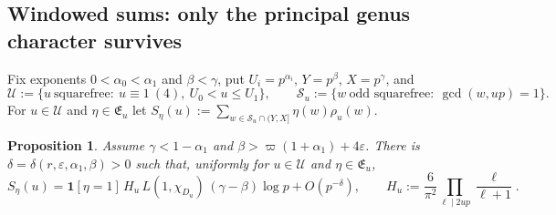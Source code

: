 \documentclass[11pt,reqno]{amsart}
\newtheorem{proposition}[theorem]{Proposition}
\theoremstyle{definition}
\newcommand{\eps}{\varepsilon}
\newcommand{\cE}{\mathfrak E}
\newcommand{\cS}{\mathcal S}
\newcommand{\cU}{\mathcal U}
\begin{document}
\subsection{Windowed sums: only the principal genus character survives}
Fix exponents $0<\alpha_0<\alpha_1$ and $\beta<\gamma$, put
$U_i=p^{\alpha_i}$, $Y=p^\beta$, $X=p^\gamma$, and
\[
 \cU:=\{u\ \text{squarefree}:\ u\equiv1\ (4),\ U_0<u\le U_1\},\qquad
 \cS_u:=\{w\ \text{odd squarefree}:\ \gcd(w,up)=1\}.
\]
For $u\in\cU$ and $\eta\in\cE_u$ let
$S_\eta(u):=\sum_{w\in\cS_u\cap(Y,X]}\eta(w)\rho_u(w)$.

\begin{proposition}\label{prop:window}
Assume $\gamma<1-\alpha_1$ and $\beta>\varpi(1+\alpha_1)+4\eps$.  There is
$\delta=\delta(r,\eps,\alpha_1,\beta)>0$ such that, uniformly for $u\in\cU$
and $\eta\in\cE_u$,
\[
 S_\eta(u)=\mathbf 1[\eta=1]\,H_u\,L(1,\chi_{D_u})\,(\gamma-\beta)\log p
 +O(p^{-\delta}),\qquad
 H_u:=\frac6{\pi^2}\prod_{\ell\mid2up}\frac{\ell}{\ell+1}.
\]
\end{proposition}
\end{document}
